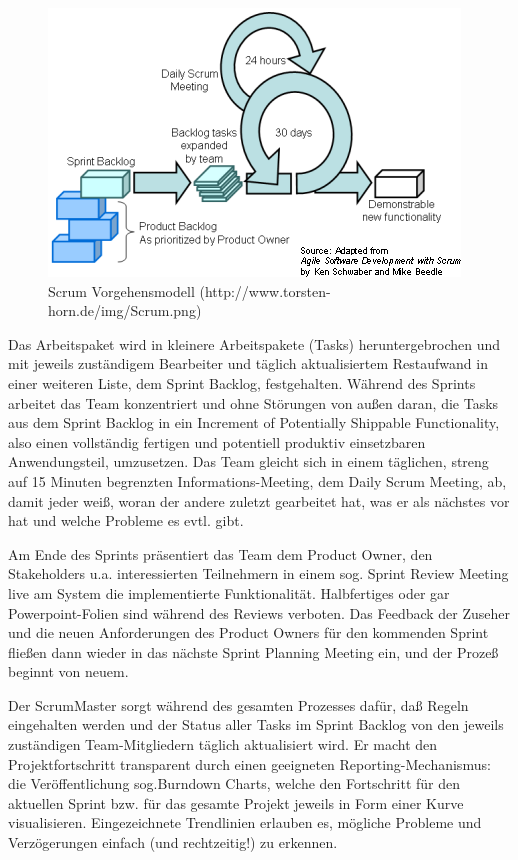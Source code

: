 \documentclass[11pt]{scrreprt}
\begin{document}
\begin{figure}[hbt]
    \includegraphics{Scrum.png}
    \caption{Scrum Vorgehensmodell (http://www.torsten-horn.de/img/Scrum.png)}
\end{figure}

Das Arbeitspaket wird in kleinere Arbeitspakete (Tasks) heruntergebrochen und mit jeweils zuständigem Bearbeiter und täglich aktualisiertem Restaufwand in einer weiteren Liste, dem Sprint Backlog, festgehalten.  Während des Sprints arbeitet das Team konzentriert und ohne Störungen von außen daran, die Tasks aus dem Sprint Backlog in ein Increment of Potentially Shippable Functionality, also einen vollständig fertigen und potentiell produktiv einsetzbaren Anwendungsteil, umzusetzen. Das Team gleicht sich in einem täglichen, streng auf 15 Minuten begrenzten Informations-Meeting, dem Daily Scrum Meeting, ab, damit jeder weiß, woran der andere zuletzt gearbeitet hat, was er als nächstes vor hat und welche Probleme es evtl. gibt.

Am Ende des Sprints präsentiert das Team dem Product Owner, den Stakeholders u.a. interessierten Teilnehmern in einem sog. Sprint Review Meeting live am System die implementierte Funktionalität. Halbfertiges oder gar Powerpoint-Folien sind während des Reviews verboten. Das Feedback der Zuseher und die neuen Anforderungen des Product Owners für den kommenden Sprint fließen dann wieder in das nächste Sprint Planning Meeting ein, und der Prozeß beginnt von neuem.

Der ScrumMaster sorgt während des gesamten Prozesses dafür, daß Regeln eingehalten werden und der Status aller Tasks im Sprint Backlog von den jeweils zuständigen Team-Mitgliedern täglich aktualisiert wird. Er macht den Projektfortschritt transparent durch einen geeigneten Reporting-Mechanismus: die Veröffentlichung sog.Burndown Charts, welche den Fortschritt für den aktuellen Sprint bzw. für das gesamte Projekt jeweils in Form einer Kurve visualisieren. Eingezeichnete Trendlinien erlauben es, mögliche Probleme und Verzögerungen einfach (und rechtzeitig!) zu erkennen.
\end{document}
